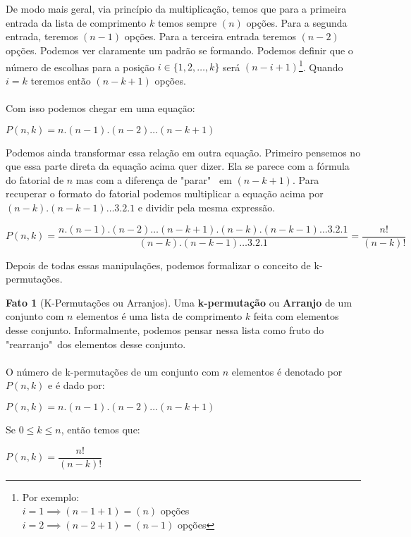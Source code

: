 \documentclass[a4paper,11pt]{book}
\theoremstyle{definition}
\theoremstyle{break}
\newtheorem{fact}{Fato}[section]
\begin{document}
\\
\\
De modo mais geral, via princípio da multiplicação, temos que para a primeira entrada da lista de comprimento $k$ temos sempre $(n)$ opções. Para a segunda entrada, teremos $(n - 1)$ opções. Para a terceira entrada teremos $(n - 2)$ opções. Podemos ver claramente um padrão se formando. Podemos definir que o número de escolhas para a posição $i \in \{1,2,\dots,k\}$ será $(n - i + 1)$\footnote{Por exemplo: \\ $i = 1 \implies (n - 1 + 1) = (n)$ opções \\ $i = 2 \implies (n - 2 + 1) = (n - 1)$ opções}. Quando $i = k$ teremos então $(n - k + 1)$ opções.
\\
\\
Com isso podemos chegar em uma equação:
\begin{center}
$ P(n,k) = n . (n - 1) . (n - 2) \dots (n - k + 1) $
\end{center}

Podemos ainda transformar essa relação em outra equação. Primeiro pensemos no que essa parte direta da equação acima quer dizer. Ela se parece com a fórmula do fatorial de $n$ mas com a diferença de "parar" \ em $(n - k + 1)$. Para recuperar o formato do fatorial podemos multiplicar a equação acima por $ (n - k) . (n - k - 1) \dots 3 . 2 . 1 $ e dividir pela mesma expressão.

\begin{center}
\small $ P(n,k) = \dfrac{n . (n - 1) . (n - 2) \dots (n - k + 1) . (n - k) . (n - k - 1) \dots 3 . 2 . 1}{(n - k) . (n - k - 1) \dots 3 . 2 . 1} = \dfrac{n!}{(n-k)!}$
\end{center}

Depois de todas essas manipulações, podemos formalizar o conceito de k-permutações.

\begin{fact}[K-Permutações ou Arranjos]
Uma \textbf{k-permutação} ou \textbf{Arranjo} de um conjunto com $n$ elementos é uma lista de comprimento $k$ feita com elementos desse conjunto. Informalmente, podemos pensar nessa lista como fruto do "rearranjo"\ dos elementos desse conjunto.
\\
\\
O número de k-permutações de um conjunto com $n$ elementos é denotado por $P(n,k)$ e é dado por:\\
\begin{center}
$ P(n,k) = n . (n - 1) . (n - 2) \dots (n - k + 1) $
\end{center}

Se $0 \leq k \leq n$, então temos que:\\
\begin{center}
 $ P(n,k) = \dfrac{n!}{(n - k)!} $
\end{center}
\end{fact}
\end{document}

